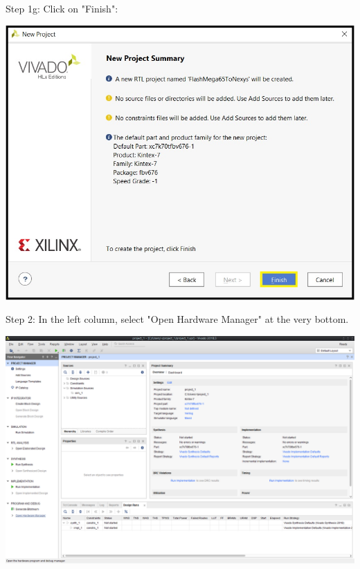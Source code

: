 \begin{minipage}{\linewidth}
  Step 1g: Click on "Finish": \\
  \begin{center}
    \includegraphics[width=0.8\linewidth]{images/vivado01g.png}
  \end{center}
\end{minipage}

\vspace{5mm}

\begin{minipage}{\linewidth}
  Step 2: In the left column, select "Open Hardware Manager"
  at the very bottom.
  \\
  \begin{center}
    \includegraphics[width=0.8\linewidth]{images/vivado02.png}
  \end{center}
\end{minipage}


